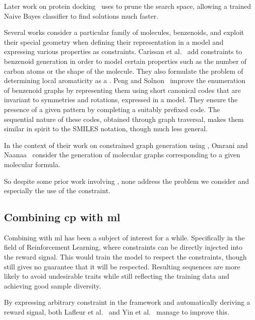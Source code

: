 \documentclass[../Document.tex]{subfiles}
\begin{document}
Later work on protein docking~\cite{DBLP:journals/almob/KrippahlB15} uses \cp to prune the search space, allowing a trained Naive Bayes classifier to find solutions much faster.

Several works consider a particular family of molecules, benzenoids, and exploit their special geometry when defining their representation in a \cp model and expressing various properties as constraints.
Carissan et al.~\cite{DBLP:journals/constraints/CarissanHPTV22,DBLP:journals/jcisd/VaretPTHC22} add constraints to benzenoid generation in order to model certain properties such as the number of carbon atoms or the shape of the molecule.
They also formulate the problem of determining local aromaticity as a \csp.
Peng and Solnon~\cite{DBLP:conf/cp/PengS23} improve the enumeration of benzenoid graphs by representing them using short canonical codes that are invariant to symmetries and rotations, expressed in a \cp model.
They ensure the presence of a given pattern by completing a suitably prefixed code.
The sequential nature of these codes, obtained through graph traversal, makes them similar in spirit to the SMILES notation, though much less general.

In the context of their work on constrained graph generation using \cp, Omrani and\\ Naanaa~\cite{DBLP:journals/constraints/OmraniN20} consider the generation of molecular graphs corresponding to a given molecular formula.

So despite some prior work involving \cp, none address the problem we consider and especially the use of the \grammar constraint.


\subsection{Combining \acrshort{cp} with \acrshort{ml}}
\label{sec:lit-review/gpt+cp}
Combining \cp with \gls{ml} has been a subject of interest for a while.
Specifically in the field of Reinforcement Learning, where constraints can be directly injected into the reward signal.
This would train the model to respect the constraints, though still gives no guarantee that it will be respected.
Resulting sequences are more likely to avoid undesirable traits while still reflecting the training data and achieving good sample diversity.

By expressing arbitrary constraint in the \cpbp framework and automatically deriving a reward signal, both Lafleur et al.~\cite{DBLP:conf/cp/LafleurCP22} and Yin et al.~\cite{DBLP:conf/cpaior/YinCP24} manage to improve this.
\end{document}
